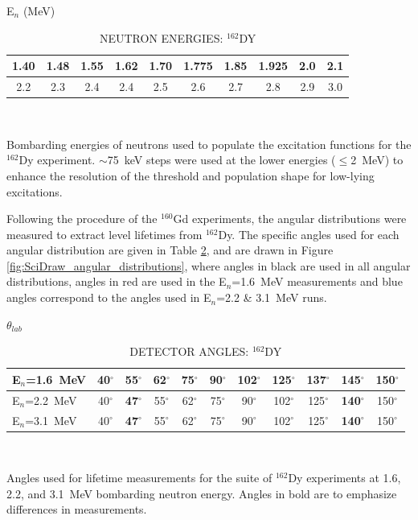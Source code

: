\begin{table}[h]
\begin{center}
\caption{NEUTRON ENERGIES: $^{162}$DY \label{tab:DyExF}}
E$_n$ (MeV)\\
\begin{tabular}{c|c|c|c|c|c|c|c|c|c}
\hline
\hline
1.40 & 1.48 & 1.55 & 1.62 & 1.70 & 1.775 & 1.85 & 1.925 & 2.0 & 2.1 \\ 
\hline
2.2 & 2.3 & 2.4 & 2.4 & 2.5 & 2.6 & 2.7 & 2.8 & 2.9 & 3.0 
\end{tabular}\\\vspace{10pt}
\end{center}
Bombarding energies of neutrons used to populate the excitation functions for the $^{162}$Dy experiment. $\sim$75~keV steps were used at the lower energies ($\le$2~MeV) to enhance the resolution of the threshold and population shape for low-lying excitations.
\end{table}

Following the procedure of the $^{160}$Gd experiments, the angular distributions were measured to extract level lifetimes from $^{162}$Dy. The specific angles used for each angular distribution are given in Table \ref{tab:DyAD}, and are drawn in Figure \ref{fig:SciDraw_angular_distributions}, where angles in black are used in all angular distributions, angles in red are used in the E$_n$=1.6~MeV measurements and blue angles correspond to the angles used in E$_n$=2.2 \& 3.1~MeV runs.

\begin{table}[b]
\begin{center}
\caption{DETECTOR ANGLES: $^{162}$DY \label{tab:DyAD}}
$\theta_{lab}$\\
\begin{tabular}{l|c|c|c|c|c|c|c|c|c|c}
\hline
\hline
E$_n$=1.6~MeV & 40$^{\circ}$ & 55$^{\circ}$ &  62$^{\circ}$ & 75$^{\circ}$ & 90$^{\circ}$ & 102$^{\circ}$ & 125$^{\circ}$ & \textbf{137$^{\circ}$} & \textbf{145$^{\circ}$} &  150$^{\circ}$\\
\hline
E$_n$=2.2~MeV & 40$^{\circ}$ & \textbf{47$^{\circ}$} & 55$^{\circ}$ &  62$^{\circ}$ & 75$^{\circ}$ & 90$^{\circ}$ & 102$^{\circ}$ & 125$^{\circ}$ & \textbf{140$^{\circ}$} &  150$^{\circ}$\\
\hline
E$_n$=3.1~MeV & 40$^{\circ}$ & \textbf{47$^{\circ}$} & 55$^{\circ}$ &  62$^{\circ}$ & 75$^{\circ}$ & 90$^{\circ}$ & 102$^{\circ}$ & 125$^{\circ}$ & \textbf{140$^{\circ}$} &  150$^{\circ}$\\
\hline
\end{tabular}\\\vspace{10pt}
\end{center}
Angles used for lifetime measurements for the suite of $^{162}$Dy experiments at 1.6, 2.2, and 3.1~MeV bombarding neutron energy. Angles in bold are to emphasize differences in measurements.
\end{table}

